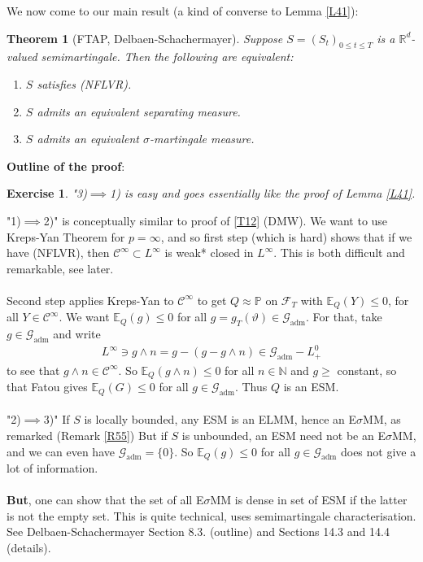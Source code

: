 \documentclass[12pt,a4paper, twoside]{article}
\newtheorem{thm}{Theorem}[section]
\newtheorem{exe}{Exercise}[section]
\theoremstyle{definition}
\newcommand{\EE}{\mathbb{E}} %
\newcommand{\PP}{\mathbb{P}} %
\begin{document}
\newpage
We now come to our main result (a kind of converse to Lemma \ref{L41}):
\begin{thm}[FTAP, Delbaen-Schachermayer] \label{T45} Suppose $S=(S_t)_{0 \leq t \leq T}$ is a $\mathbb{R}^d$-valued semimartingale. Then the following are equivalent:
\begin{enumerate}
\item $S$ satisfies (NFLVR).
\item $S$ admits an equivalent separating measure.
\item $S$ admits an equivalent $\sigma$-martingale measure. 
\end{enumerate}
\end{thm}
\noindent \textbf{Outline of  the proof}:
\begin{exe} "3)$\implies$1) is easy and goes essentially like the proof of Lemma \ref{L41}.
\end{exe}
\noindent "1)$\implies$2)" is conceptually similar to proof of \ref{T12} (DMW). We want to use Kreps-Yan Theorem for $p= \infty$, and so first step (which is hard) shows that if we have (NFLVR), then $\mathcal{C}^\infty \subset L^\infty$ is weak* closed in $L^\infty$. This is both difficult and remarkable,  see later. \\
\\
Second step applies Kreps-Yan to $\mathcal{C}^\infty$ to get $Q \approx \PP$ on $\mathcal{F}_T$ with $\EE_Q(Y) \leq 0$, for all $Y \in \mathcal{C}^\infty$. We want $\EE_Q(g) \leq 0$ for all $g= g_T( \vartheta) \in \mathcal{G}_\text{adm}$. For that, take $g \in \mathcal{G}_\text{adm}$ and write 
\begin{align*}
L^\infty \ni g \wedge n = g-(g-g \wedge n) \in \mathcal{G}_\text{adm}-L_+^0
\end{align*}
to see that $g \wedge n \in \mathcal{C}^\infty$. So $\EE_Q(g \wedge n) \leq 0$ for all $n \in \mathbb{N}$ and $g \geq$ constant, so that Fatou gives $\EE_Q(G) \leq 0$ for all $g \in \mathcal{G}_\text{adm}$. Thus $Q$ is an ESM. 
\\\\
"2)$\implies$3)" If $S$ is locally bounded, any ESM is an ELMM, hence an E$\sigma$MM, as remarked (Remark \ref{R55}) But if $S$ is unbounded, an ESM need not be an E$\sigma$MM, and we can even have $\mathcal{G}_\text{adm}= \{0\}$. So $\EE_Q(g) \leq 0$ for all $g \in \mathcal{G}_\text{adm}$ does not give a lot of information. \\
\\
\textbf{But}, one can show that the set of all E$\sigma$MM is dense in set of ESM if the latter is not the empty set. This is quite technical, uses semimartingale characterisation. See Delbaen-Schachermayer Section 8.3. (outline) and Sections 14.3 and 14.4 (details). 
\end{document}
